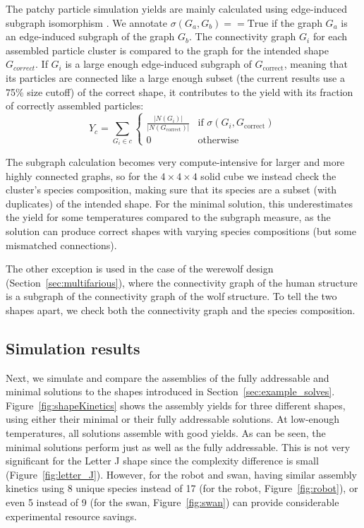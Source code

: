 The patchy particle simulation yields are  mainly calculated using edge-induced subgraph isomorphism \cite{networkx}. 
We annotate \(\sigma(G_a,G_b) == \text{True}\) if the graph \(G_a\) is an edge-induced subgraph of the graph \(G_b\).
The connectivity graph \(G_i\) for each assembled particle cluster is compared to the graph for the intended shape \(G_{correct}\). If \(G_i\) is a large enough edge-induced subgraph of \(G_{\text{correct}}\), meaning that its particles are connected like a large enough subset (the current results use a 75\% size cutoff) of the correct shape, it contributes to the yield with its fraction of correctly assembled particles:
\begin{equation}
    Y_{c} = \sum_{G_i \in c} \begin{cases} 
           \frac{\left|N(G_i)\right|}{\left|N(G_{\text{correct}})\right|} & \text{if } \sigma(G_i,G_{\text{correct}}) \\
                          0 & \text{otherwise}
                        \end{cases}
\end{equation}

The subgraph calculation becomes very compute-intensive for larger and more highly connected graphs, so for the \(4 \times 4 \times 4\) solid cube we instead check the cluster's species composition, making sure that its species are a subset (with duplicates) of the intended shape. For the minimal solution, this underestimates the yield for some temperatures compared to the subgraph measure, as the solution can produce correct shapes with varying species compositions (but some mismatched connections). 

The other exception is used in the case of the werewolf design (Section~\ref{sec:multifarious}), where the connectivity graph of the human structure is a subgraph of the connectivity graph of the wolf structure. To tell the two shapes apart, we check both the connectivity graph and the species composition.


\subsection{Simulation results}

Next, we simulate and compare the assemblies of the fully addressable and minimal solutions to the shapes introduced in Section~\ref{sec:example_solves}. Figure~\ref{fig:shapeKinetics} shows the assembly yields for three different shapes, using either their minimal or their fully addressable solutions. At low-enough temperatures, all solutions assemble with good yields. As can be seen, the minimal solutions perform just as well as the fully addressable. This is not very significant for the Letter J shape since the complexity difference is small (Figure~\ref{fig:letter_J}). However, for the robot and swan, having similar assembly kinetics using 8 unique species instead of 17 (for the robot, Figure~\ref{fig:robot}), or even 5 instead of 9 (for the swan, Figure~\ref{fig:swan}) can provide considerable experimental resource savings.


